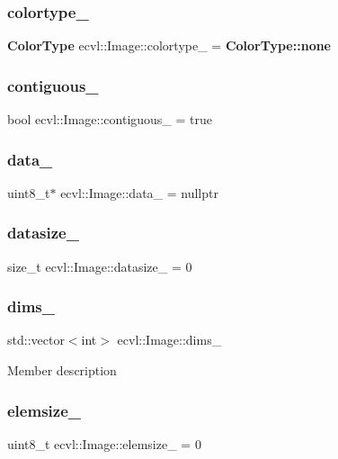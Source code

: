 \subsubsection{colortype\_}
{\footnotesize\ttfamily \textbf{ Color\+Type} ecvl\+::\+Image\+::colortype\+\_\+ = \textbf{ Color\+Type\+::none}}

\mbox{\label{classecvl_1_1_image_a709cf6785d9340859f9e8dba1f950f7a}} 
\subsubsection{contiguous\_}
{\footnotesize\ttfamily bool ecvl\+::\+Image\+::contiguous\+\_\+ = true}

\mbox{\label{classecvl_1_1_image_ac3bdae3b8e7b4b02fa137f4a4c900cc2}} 
\subsubsection{data\_}
{\footnotesize\ttfamily uint8\+\_\+t$\ast$ ecvl\+::\+Image\+::data\+\_\+ = nullptr}

\mbox{\label{classecvl_1_1_image_a1855a32639c8385ba96f9e151ca882d2}} 
\subsubsection{datasize\_}
{\footnotesize\ttfamily size\+\_\+t ecvl\+::\+Image\+::datasize\+\_\+ = 0}

\mbox{\label{classecvl_1_1_image_af26f5a4e644cef20597bd084bcddf1d0}} 
\subsubsection{dims\_}
{\footnotesize\ttfamily std\+::vector$<$int$>$ ecvl\+::\+Image\+::dims\+\_\+}

Member description \mbox{\label{classecvl_1_1_image_a45a4b6379cc953438867ec2753a65648}} 
\subsubsection{elemsize\_}
{\footnotesize\ttfamily uint8\+\_\+t ecvl\+::\+Image\+::elemsize\+\_\+ = 0}

